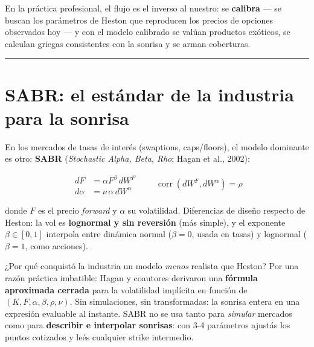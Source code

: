 \documentclass[
  spanish,
  letterpaper,
  DIV=11,
  numbers=noendperiod]{scrreprt}
\begin{document}
En la práctica profesional, el flujo es el inverso al nuestro: se
\textbf{calibra} --- se buscan los parámetros de Heston que reproducen
los precios de opciones observados hoy --- y con el modelo calibrado se
valúan productos exóticos, se calculan griegas consistentes con la
sonrisa y se arman coberturas.

\begin{center}\rule{0.5\linewidth}{0.5pt}\end{center}

\chapter{SABR: el estándar de la industria para la
sonrisa}\label{sabr-el-estuxe1ndar-de-la-industria-para-la-sonrisa}

En los mercados de tasas de interés (swaptions, caps/floors), el modelo
dominante es otro: \textbf{SABR} (\emph{Stochastic Alpha, Beta, Rho};
Hagan et al., 2002):

\[\begin{aligned} dF &= \alpha F^{\beta} \, dW^F \\ d\alpha &= \nu \, \alpha \, dW^{\alpha} \end{aligned} \qquad \operatorname{corr}(dW^F, dW^{\alpha}) = \rho\]

donde \(F\) es el precio \emph{forward} y \(\alpha\) su volatilidad.
Diferencias de diseño respecto de Heston: la vol es \textbf{lognormal y
sin reversión} (más simple), y el exponente \(\beta \in [0,1]\)
interpola entre dinámica normal (\(\beta=0\), usada en tasas) y
lognormal (\(\beta=1\), como acciones).

¿Por qué conquistó la industria un modelo \emph{menos} realista que
Heston? Por una razón práctica imbatible: Hagan y coautores derivaron
una \textbf{fórmula aproximada cerrada} para la volatilidad implícita en
función de \((K, F, \alpha, \beta, \rho, \nu)\). Sin simulaciones, sin
transformadas: la sonrisa entera en una expresión evaluable al instante.
SABR no se usa tanto para \emph{simular} mercados como para
\textbf{describir e interpolar sonrisas}: con 3-4 parámetros ajustás los
puntos cotizados y leés cualquier strike intermedio.
\end{document}
